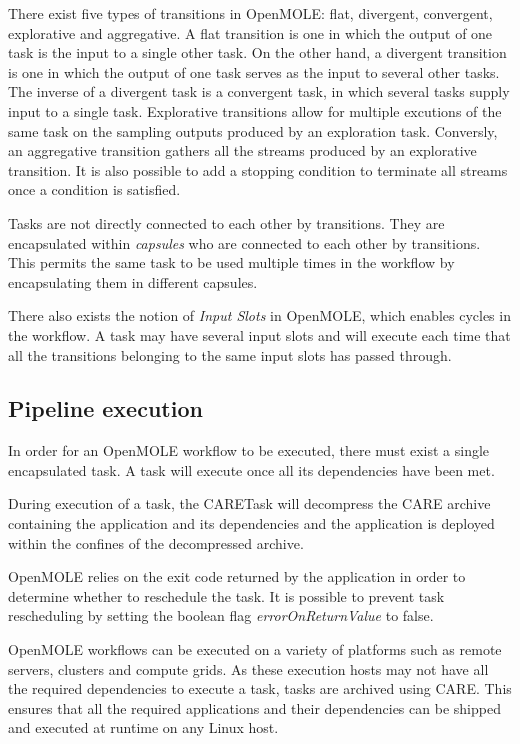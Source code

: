 \documentclass{report}
\begin{document}
      There exist five types of transitions in OpenMOLE: flat, divergent,
      convergent, explorative and aggregative. A flat transition is one in which
      the output of one task is the input to a single other task. On the other
      hand, a divergent transition is one in which the output of one task serves
      as the input to several other tasks. The inverse of a divergent task is a
      convergent task, in which several tasks supply input to a single task.
      Explorative transitions allow for multiple excutions of the same task on
      the sampling outputs produced by an exploration task. Conversly, an
      aggregative transition gathers all the streams produced by an explorative
      transition. It is also possible to add a stopping condition to terminate
      all streams once a condition is satisfied.

      Tasks are not directly connected to each other by transitions. They are
      encapsulated within \textit{capsules} who are connected to each other by
      transitions. This permits the same task to be used multiple times in the
      workflow by encapsulating them in different capsules.

    There also exists the notion of \textit{Input Slots} in OpenMOLE, which
    enables cycles in the workflow. A task may have several input slots and will
    execute each time that all the transitions belonging to the same input slots
    has passed through.
 
                

        \subsection{Pipeline execution}

      In order for an OpenMOLE workflow to be executed, there must exist a
      single encapsulated task. A task will execute once all its dependencies
      have been met. 

    During execution of a task, the CARETask will decompress the CARE archive
    containing the application and its dependencies and the application is
    deployed within the confines of the decompressed archive. 

OpenMOLE relies on the exit code returned by the application in order to
determine whether to reschedule the task. It is possible to prevent task
rescheduling by setting the boolean flag \textit{errorOnReturnValue} to false.
    
      OpenMOLE workflows can be executed on a variety of platforms such as
      remote servers, clusters and compute grids. As these execution hosts may
      not have all the required dependencies to execute a task, tasks are
      archived using CARE. This ensures that all the required applications and
      their dependencies can be shipped and executed at runtime on any Linux
      host.
\end{document}
